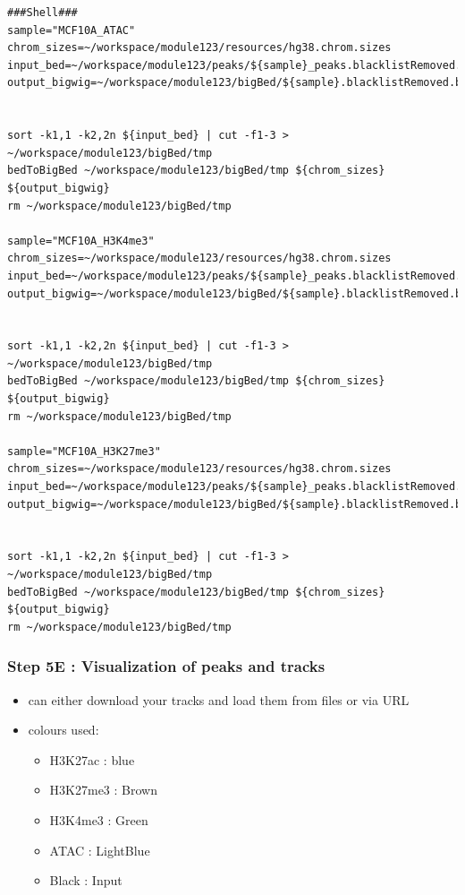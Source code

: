\documentclass[
]{book}
\providecommand{\tightlist}{%
  \setlength{\itemsep}{0pt}\setlength{\parskip}{0pt}}
\begin{document}
\begin{verbatim}
###Shell###
sample="MCF10A_ATAC"
chrom_sizes=~/workspace/module123/resources/hg38.chrom.sizes
input_bed=~/workspace/module123/peaks/${sample}_peaks.blacklistRemoved.narrowPeak
output_bigwig=~/workspace/module123/bigBed/${sample}.blacklistRemoved.bb


sort -k1,1 -k2,2n ${input_bed} | cut -f1-3 > ~/workspace/module123/bigBed/tmp
bedToBigBed ~/workspace/module123/bigBed/tmp ${chrom_sizes} ${output_bigwig}
rm ~/workspace/module123/bigBed/tmp

sample="MCF10A_H3K4me3"
chrom_sizes=~/workspace/module123/resources/hg38.chrom.sizes
input_bed=~/workspace/module123/peaks/${sample}_peaks.blacklistRemoved.narrowPeak
output_bigwig=~/workspace/module123/bigBed/${sample}.blacklistRemoved.bb


sort -k1,1 -k2,2n ${input_bed} | cut -f1-3 > ~/workspace/module123/bigBed/tmp
bedToBigBed ~/workspace/module123/bigBed/tmp ${chrom_sizes} ${output_bigwig}
rm ~/workspace/module123/bigBed/tmp

sample="MCF10A_H3K27me3"
chrom_sizes=~/workspace/module123/resources/hg38.chrom.sizes
input_bed=~/workspace/module123/peaks/${sample}_peaks.blacklistRemoved.broadPeak
output_bigwig=~/workspace/module123/bigBed/${sample}.blacklistRemoved.bb


sort -k1,1 -k2,2n ${input_bed} | cut -f1-3 > ~/workspace/module123/bigBed/tmp
bedToBigBed ~/workspace/module123/bigBed/tmp ${chrom_sizes} ${output_bigwig}
rm ~/workspace/module123/bigBed/tmp
\end{verbatim}

\subsubsection{Step 5E : Visualization of peaks and tracks}\label{step-5e-visualization-of-peaks-and-tracks}

\begin{itemize}
\tightlist
\item
  can either download your tracks and load them from files or via URL
\item
  colours used:

  \begin{itemize}
  \tightlist
  \item
    H3K27ac : blue
  \item
    H3K27me3 : Brown
  \item
    H3K4me3 : Green
  \item
    ATAC : LightBlue
  \item
    Black : Input
  \end{itemize}
\end{itemize}
\end{document}

